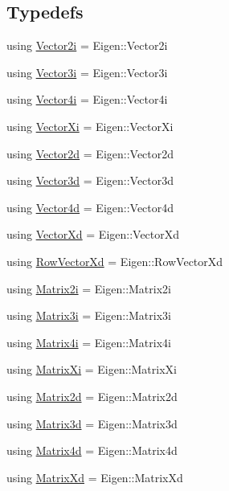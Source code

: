 \subsection*{Typedefs}
\begin{DoxyCompactItemize}
\item 
using \hyperlink{namespacelibrary_1_1math_1_1obj_a27d8117bb406c37fd0aee60b61f0bcb9}{Vector2i} = Eigen\+::\+Vector2i
\item 
using \hyperlink{namespacelibrary_1_1math_1_1obj_a9d2ecef9029409b29e79b366e0b9941f}{Vector3i} = Eigen\+::\+Vector3i
\item 
using \hyperlink{namespacelibrary_1_1math_1_1obj_a5181dbb9520bc27fe956555569ef1271}{Vector4i} = Eigen\+::\+Vector4i
\item 
using \hyperlink{namespacelibrary_1_1math_1_1obj_a2cd4b891130c163c72ea6a546132cb2d}{Vector\+Xi} = Eigen\+::\+Vector\+Xi
\item 
using \hyperlink{namespacelibrary_1_1math_1_1obj_a2fa27512c4f4b07db35d602cfdd2c293}{Vector2d} = Eigen\+::\+Vector2d
\item 
using \hyperlink{namespacelibrary_1_1math_1_1obj_a977e84e9bf317a4e7dd9d6d671d6da2f}{Vector3d} = Eigen\+::\+Vector3d
\item 
using \hyperlink{namespacelibrary_1_1math_1_1obj_a5679bbebea773cc0d4ed6ec28eb79c03}{Vector4d} = Eigen\+::\+Vector4d
\item 
using \hyperlink{namespacelibrary_1_1math_1_1obj_a54fa1a789b235483252f0525f0abf579}{Vector\+Xd} = Eigen\+::\+Vector\+Xd
\item 
using \hyperlink{namespacelibrary_1_1math_1_1obj_a0ece80fce95e1fdaeea8b3e232b45765}{Row\+Vector\+Xd} = Eigen\+::\+Row\+Vector\+Xd
\item 
using \hyperlink{namespacelibrary_1_1math_1_1obj_abd4bcf17b090b90261299f718df7fd50}{Matrix2i} = Eigen\+::\+Matrix2i
\item 
using \hyperlink{namespacelibrary_1_1math_1_1obj_a7e74feec88408f948fe6d4a18d274619}{Matrix3i} = Eigen\+::\+Matrix3i
\item 
using \hyperlink{namespacelibrary_1_1math_1_1obj_af485a47cffc7369c6b462b1a58b4db60}{Matrix4i} = Eigen\+::\+Matrix4i
\item 
using \hyperlink{namespacelibrary_1_1math_1_1obj_a3b9388d308b3ea0f1f8fe9b9dedaed0c}{Matrix\+Xi} = Eigen\+::\+Matrix\+Xi
\item 
using \hyperlink{namespacelibrary_1_1math_1_1obj_a967d79db25d723ff05600d29055be7b9}{Matrix2d} = Eigen\+::\+Matrix2d
\item 
using \hyperlink{namespacelibrary_1_1math_1_1obj_a49dc66c2ba45a70c9fcef7aa03ba0b42}{Matrix3d} = Eigen\+::\+Matrix3d
\item 
using \hyperlink{namespacelibrary_1_1math_1_1obj_adde130f80968bf89120e5ff29929bfed}{Matrix4d} = Eigen\+::\+Matrix4d
\item 
using \hyperlink{namespacelibrary_1_1math_1_1obj_a4da50132532e4544429d239909ccbd79}{Matrix\+Xd} = Eigen\+::\+Matrix\+Xd
\end{DoxyCompactItemize}


